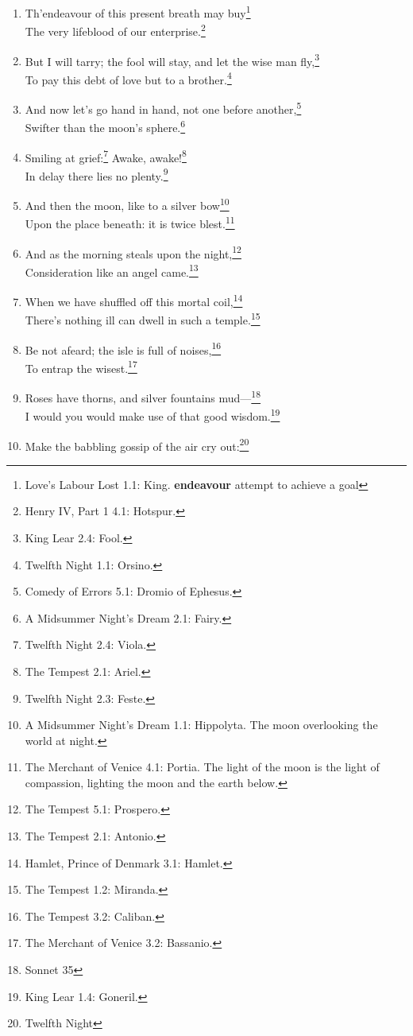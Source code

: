 \documentclass[17pt,twoside]{extarticle}
\begin{document}
\begin{enumerate}
\item
  Th'endeavour of this present breath may buy\footnote{Love's Labour
    Lost 1.1: King. \textbf{endeavour} attempt to achieve a goal}\\The
  very lifeblood of our enterprise.\footnote{Henry IV, Part 1 4.1:
    Hotspur.}
\item
  But I will tarry; the fool will stay, and let the wise man
  fly,\footnote{King Lear 2.4: Fool.}\\To pay this debt of love but to a
  brother.\footnote{Twelfth Night 1.1: Orsino.}
\item
  And now let's go hand in hand, not one before another,\footnote{Comedy
    of Errors 5.1: Dromio of Ephesus.}\\Swifter than the moon's
  sphere.\footnote{A Midsummer Night's Dream 2.1: Fairy.}
\item
  Smiling at grief:\footnote{Twelfth Night 2.4: Viola.} Awake,
  awake!\footnote{The Tempest 2.1: Ariel.}\\In delay there lies no
  plenty.\footnote{Twelfth Night 2.3: Feste.}
\item
  And then the moon, like to a silver bow\footnote{A Midsummer Night's
    Dream 1.1: Hippolyta. The moon overlooking the world at night.}\\Upon
  the place beneath: it is twice blest.\footnote{The Merchant of Venice
    4.1: Portia. The light of the moon is the light of compassion,
    lighting the moon and the earth below.}
\item
  And as the morning steals upon the night,\footnote{The Tempest 5.1:
    Prospero.}\\Consideration like an angel came.\footnote{The Tempest
    2.1: Antonio.}
\item
  When we have shuffled off this mortal coil,\footnote{Hamlet, Prince of
    Denmark 3.1: Hamlet.}\\There's nothing ill can dwell in such a
  temple.\footnote{The Tempest 1.2: Miranda.}
\item
  Be not afeard; the isle is full of noises,\footnote{The Tempest 3.2:
    Caliban.}\\To entrap the wisest.\footnote{The Merchant of Venice
    3.2: Bassanio.}
\item
  Roses have thorns, and silver fountains mud---\footnote{Sonnet 35}\\I
  would you would make use of that good wisdom.\footnote{King Lear 1.4:
    Goneril.}
\item
  Make the babbling gossip of the air cry out:\footnote{Twelfth Night
}
\end{enumerate}
\end{document}
